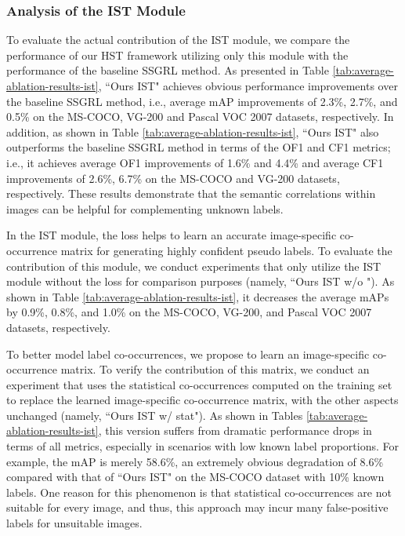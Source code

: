 \subsubsection{Analysis of the IST Module}
To evaluate the actual contribution of the IST module, we compare the performance of our HST framework utilizing only this module with the performance of the baseline SSGRL method. As presented in Table \ref{tab:average-ablation-results-ist}, ``Ours IST" achieves obvious performance improvements over the baseline SSGRL method, i.e., average mAP improvements of 2.3\%, 2.7\%, and 0.5\% on the MS-COCO, VG-200 and Pascal VOC 2007 datasets, respectively. In addition, as shown in Table \ref{tab:average-ablation-results-ist}, ``Ours IST" also outperforms the baseline SSGRL method in terms of the OF1 and CF1 metrics; i.e., it achieves average OF1 improvements of 1.6\% and 4.4\% and average CF1 improvements of 2.6\%, 6.7\% on the MS-COCO and VG-200 datasets, respectively. These results demonstrate that the semantic correlations within images can be helpful for complementing unknown labels.


In the IST module, the loss  helps to learn an accurate image-specific co-occurrence matrix for generating highly confident pseudo labels. To evaluate the contribution of this module, we conduct experiments that only utilize the IST module without the loss for comparison purposes (namely, ``Ours IST w/o "). As shown in Table \ref{tab:average-ablation-results-ist}, it decreases the average mAPs by 0.9\%, 0.8\%, and 1.0\% on the MS-COCO, VG-200, and Pascal VOC 2007 datasets, respectively.

To better model label co-occurrences, we propose to learn an image-specific co-occurrence matrix. To verify the contribution of this matrix, we conduct an experiment that uses the statistical co-occurrences computed on the training set to replace the learned image-specific co-occurrence matrix, with the other aspects unchanged (namely, ``Ours IST w/ stat"). As shown in Tables \ref{tab:average-ablation-results-ist}, this version suffers from dramatic performance drops in terms of all metrics, especially in scenarios with low known label proportions. For example, the mAP is merely 58.6\%, an extremely obvious degradation of 8.6\% compared with that of ``Ours IST" on the MS-COCO dataset with 10\% known labels. One reason for this phenomenon is that statistical co-occurrences are not suitable for every image, and thus, this approach may incur many false-positive labels for unsuitable images.

